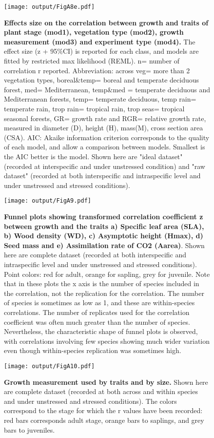 \documentclass[a4paper]{article}\usepackage[]{graphicx}\usepackage[]{color}
\begin{document}
\begin{appendices}
\begin{figure}[htbp]
\centering
\texttt{[image: output/FigA8e.pdf]}
\caption{\textbf{Effects size on the correlation between growth and traits of plant stage (mod1), vegetation type (mod2), growth measurement (mod3) and experiment type (mod4).} The effect size (z + 95\%CI) is reported for each class, and models are fitted by restricted max likelihood (REML). n= number of correlation r reported. Abbreviation: across veg= more than 2 vegetation types, boreal\&temp= boreal and temperate deciduous forest, med= Mediterranean,  temp\&med = temperate deciduous and Mediterranean forests, temp= temperate deciduous, temp rain= temperate rain, trop rain= tropical rain, trop seas= tropical seasonal forests, GR= growth rate and RGR= relative growth rate, measured in diameter (D), height (H), mass(M), cross section area (CSA). AIC: Akaike information criterion corresponds to the quality of each model, and allow a comparison between models. Smallest is the AIC better is the model. Shown here are "ideal dataset" (recorded at interspecific and under unstressed condition) and "raw dataset" (recorded at both interspecific and intraspecific level and under unstressed and stressed conditions).}
\label{FigA8}
\end{figure}

\begin{figure}[htbp]
\centering
\texttt{[image: output/FigA9.pdf]}
\caption{\textbf{Funnel plots showing transformed correlation coefficient z between growth and the traits a) Specific leaf area (SLA), b) Wood density (WD), c) Asymptotic height (Hmax), d) Seed mass and e) Assimilation rate of CO2 (Aarea)}. Shown here are complete dataset (recorded at both interspecific and intraspecific level and under unstressed and stressed conditions). Point colors: red for adult, orange for sapling, grey for juvenile. Note that in these plots the x axis is the number of species included in the correlation, not the replication for the correlation. The number of species is sometimes as low as 1, and these are within-species correlations. The number of replicates used for the correlation coefficient was often much greater than the number of species. Nevertheless, the characteristic shape of funnel plots is observed, with correlations involving few species showing much wider variation even though within-species replication was sometimes high.}

\label{FigA9}
\end{figure}

\begin{figure}[htbp]
\centering
\texttt{[image: output/FigA10.pdf]}
\caption{\textbf{Growth measurement used by traits and by size.} Shown here are complete dataset (recorded at both across and within species and under unstressed and stressed conditions). The colors correspond to the stage for which the r values have been recorded: red bars corresponds adult stage, orange bars to saplings, and grey bars to juveniles.}
\label{FigA10}
\end{figure}

\end{appendices}
\end{document}

